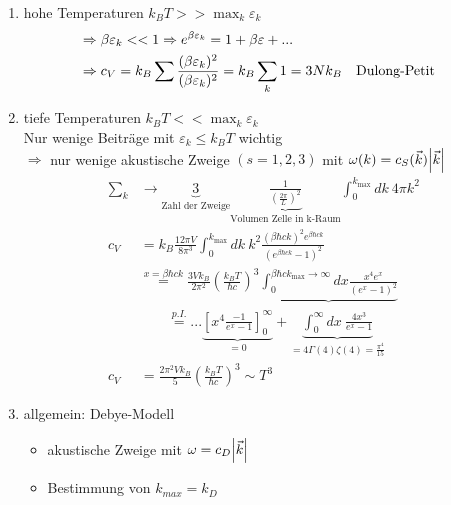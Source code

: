 \begin{enumerate}
    \item hohe Temperaturen $k_B T>>\max_k \varepsilon_k$
        \begin{align}
            &\Rightarrow \beta\varepsilon_k << 1 \Rightarrow e^{\beta\varepsilon_k}=1+\beta\varepsilon + ...\\
            &\Rightarrow c_V = k_B\sum \frac{(\beta\varepsilon_k)^2}{(\beta\varepsilon_k)^2} = k_B \sum_k 1 = 3Nk_B \qq{Dulong-Petit}
        \end{align}
    \item tiefe Temperaturen $k_B T<<\max_k \varepsilon_k$\\
        Nur wenige Beiträge mit $\varepsilon_k \leq k_BT$ wichtig\\
        $\Rightarrow$ nur wenige akustische Zweige $(s=1,2,3)$ mit $\omega(k)=c_S(\Vec{k})\abs{\Vec{k}}$
        \begin{align}
            \sum_k &\rightarrow \underbrace{3}_{\text{Zahl der Zweige}}\underbrace{\frac{1}{\left(\frac{2\pi}{L}\right)^2}}_{\text{Volumen Zelle in k-Raum}}\int_0^{k_{\max}}dk \ 4\pi k^2\\
            c_V &= k_B \frac{12\pi V}{8 \pi^3} \int_0^{k_{\max}} dk \ k^2 \frac{(\beta \hbar ck)^2 e^{\beta \hbar ck}}{(e^{\beta \hbar ck}-1)^2}\\
            &\overset{x=\beta \hbar ck}{=} \frac{3Vk_B}{2\pi^2} \left(\frac{k_BT}{\hbar c}\right)^3 \underbrace{\int_0^{\beta\hbar ck_{\max}\to \infty}dx \frac{x^4 e^x}{(e^x-1)^2}}\\
            &\qquad \stackrel{p.I.}{=} ... \underbrace{\left[x^4 \frac{-1}{e^x-1}\right]_0^\infty}_{=0} + \underbrace{\int_0^\infty dx \ \frac{4 x^3}{e^x-1}}_{=4 \Gamma(4)\zeta(4) = \frac{\pi^4}{15}}\\
            c_V &=\frac{2\pi^2Vk_B}{5} \left(\frac{k_BT}{\hbar c}\right)^3 \sim T^3
        \end{align}
        \begin{center}
        \end{center}
        \item allgemein: Debye-Modell
        \begin{itemize}
            \item akustische Zweige mit $\omega=c_D \abs{\Vec{k}}$
            \item Bestimmung von $k_{max} = k_D$
        \end{itemize}
\end{enumerate}
